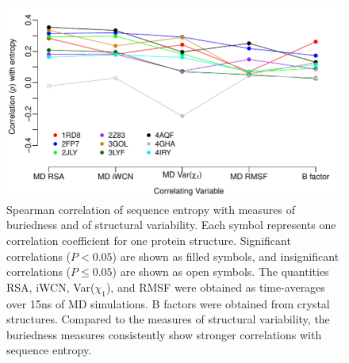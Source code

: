 \documentclass[smallextended]{svjour3}
\begin{document}
\begin{figure}[tbh]
\begin{center}
    \includegraphics[width=5in]{cor_entropy_all.pdf}
\end{center}
\caption{Spearman correlation of sequence entropy with measures of buriedness and of structural variability. Each symbol represents one correlation coefficient for one protein structure. Significant correlations ($P<0.05$) are shown as filled symbols, and insignificant correlations ($P\leq0.05$) are shown as open symbols. The quantities RSA, iWCN, Var($\chi_1$), and RMSF were obtained as time-averages over 15ns of MD simulations. B factors were obtained from crystal structures. Compared to the measures of structural variability, the buriedness measures consistently show stronger correlations with sequence entropy.}
\label{fig:cor_entropy_all}
\end{figure}
\end{document}
